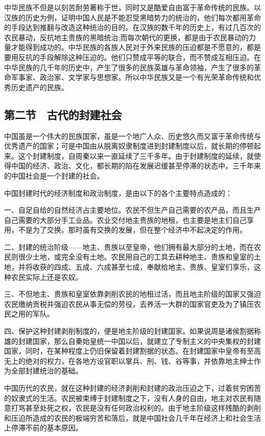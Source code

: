 中华民族不但是以刻苦耐劳著称于世，同时又是酷爱自由富于革命传统的民族。以汉族的历史为例，证明中国人民是不能忍受黑暗势力的统治的，他们每次都用革命的手段达到推翻与改造这种统治的目的。在汉族的数千年的历史上，有过几百次的农民暴动，反抗地主贵族的黑暗统治;而每次朝代的更换，都是由于农民暴动的力量才能得到成功的。中华民族的各族人民对于外来民族的压迫都是不愿意的，都是要用反抗的手段解除这种压迫的。他们只赞成平等的联合，而不赞成互相压迫。在中华民族的几千年的历史中，产生了很多的民族英雄与革命领袖，产生了很多的革命军事家、政治家、文学家与思想家。所以中华民族又是一个有光荣革命传统和优秀历史遗产的民族。

\subsection{第二节　古代的封建社会}

中国虽是一个伟大的民族国家，虽是一个地广人众、历史悠久而又富于革命传统与优秀遗产的国家；可是中国由从脱离奴隶制度进到封建制度以后，就长期的停顿起来。这个封建制度，自周秦以来一直延续了三千多年。由于封建制度的延续，就使得中国的经济、政治、文化，都长期的陷在发展迟缓甚至停滞的状态中。三千年来的中国社会是一个封建的社会。

中国封建时代的经济制度和政治制度，是由以下的各个主要特点造成的：

一、自足自给的自然经济占主要地位。农民不但生产自己需要的农产品，而且生产自己需要的大部分手工业品。农业交付地主贵族的地租，也主要是地主们自己享用，不是为了交换。那时虽有交换的发展，但在整个经济中不起决定的作用。

二、封建的统治阶级——地主、贵族以至皇帝，他们拥有最大部分的土地，而在农民则很少土地，或完全没有土地。农民用自己的工具去耕种地主、贵族和皇室的土地，并将收获的四成、五成、六成甚至七成，奉献给地主、贵族、皇室们享乐，这种农民实际上还是农奴。

三、不但地主、贵族和皇室依靠剥削农民的地租过活，而且地主阶级的国家又强迫农民缴纳贡税并强迫农民从事无偿的劳役，去养活一大群的国家官吏及为了镇压农民之用的军队。

四、保护这种封建剥削制度的，便是地主阶级的封建国家。如果说周是诸侯割据称雄的封建国家，那么自秦始皇统一中国以后，就建立了专制主义的中央集权的封建国家，同时，在某种程度上仍旧保留着封建割据的状态。在封建国家中皇帝有至高无上的绝对的权力，在各地方设官职以掌兵、刑、钱、谷等事，并依靠地主绅士作为全部封建统治的基础。

中国历代的农民，就在这种封建的经济剥削和封建的政治压迫之下，过着贫穷困苦的奴隶式的生活。农民被束缚于封建制度之下，没有人身的自由，地主对农民有随意打骂甚至处死之权，农民是没有任何政治权利的。由于地主阶级这样残酷的剥削和压迫所造成的农民的极端穷苦和落后，就是中国社会几千年在经济上和社会生活上停滞不前的基本原因。

